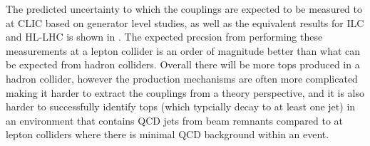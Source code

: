 The predicted uncertainty to which the couplings are expected to be measured to at \ac{CLIC} based on generator level studies, as well as the equivalent results for \ac{ILC} and \ac{HL-LHC} is shown in . The expected precsion from performing these measurements at a lepton collider is an order of magnitude better than what can be expected from hadron colliders. Overall there will be more tops produced in a hadron collider, however the production mechanisms are often more complicated making it harder to extract the couplings from a theory perspective, and it is also harder to successfully identify tops (which typcially decay to at least one jet) in an environment that contains \ac{QCD} jets from beam remnants compared to at lepton colliders where there is minimal \ac{QCD} background within an event.

